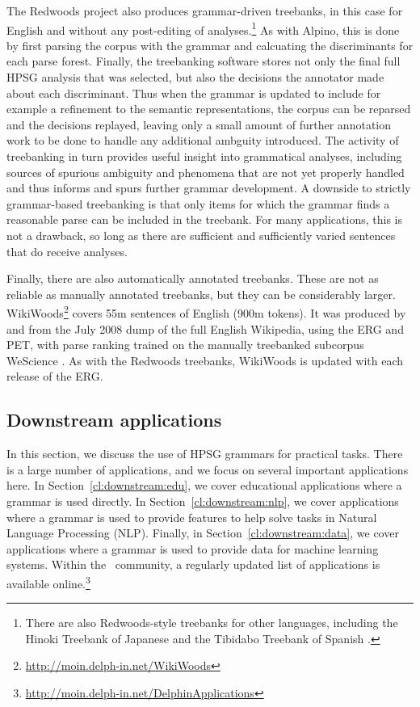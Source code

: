 \documentclass[output=paper,nonflat]{langsci/langscibook}
\begin{document}
The Redwoods project \citep{OFTM2004a-u} also produces grammar-driven
treebanks, in this case for English and without any post-editing of
analyses.\footnote{There are also Redwoods-style treebanks for other
  languages, including the Hinoki Treebank of Japanese
  \citep{bond:etal:2004} and the Tibidabo Treebank of Spanish
  \citep{marimon:2015}.}  As with Alpino, this is done by first
parsing the corpus with the grammar and calcuating the discriminants
for each parse forest.  Finally, the treebanking software stores not
only the final full HPSG analysis that was selected, but also the
decisions the annotator made about each discriminant. Thus when the
grammar is updated to include for example a refinement to the semantic
representations, the corpus can be reparsed and the decisions
replayed, leaving only a small amount of further annotation work to be
done to handle any additional ambguity introduced. The activity of
treebanking in turn provides useful insight into grammatical analyses,
including sources of spurious ambiguity and phenomena that are not yet
properly handled and thus informs and spurs further grammar
development.  A downside to strictly grammar-based treebanking is that
only items for which the grammar finds a reasonable parse can be
included in the treebank. For many applications, this is not a
drawback, so long as there are sufficient and sufficiently varied
sentences that do receive analyses.

Finally, there are also automatically annotated treebanks.
These are not as reliable as manually annotated treebanks,
but they can be considerably larger.
WikiWoods\footnote{\url{http://moin.delph-in.net/WikiWoods}}
covers 55m sentences of English (900m tokens).
It was produced by \citet{flickinger2010wikiwoods} and \citet{solberg2012wikiwoods}
from the July 2008 dump of the full English Wikipedia,
using the ERG and PET,
with parse ranking trained on the manually treebanked subcorpus WeScience \citep{ytrestol2009wescience}.
As with the Redwoods treebanks, WikiWoods is updated with each release of the ERG.



\subsection{Downstream applications}
\label{cl:downstream}

In this section, we discuss
the use of HPSG grammars for practical tasks.
There is a large number of applications,
and we focus on several important applications here.
In Section~\ref{cl:downstream:edu},
we cover educational applications where a grammar is used directly.
In Section~\ref{cl:downstream:nlp},
we cover applications where a grammar is used to provide features
to help solve tasks in Natural Language Processing (NLP).
Finally, in Section~\ref{cl:downstream:data},
we cover applications where a grammar is used to provide data for machine learning systems.
Within the \delphin\ community,
a regularly updated list of applications is available online.\footnote{%
	\url{http://moin.delph-in.net/DelphinApplications}
}
\end{document}
